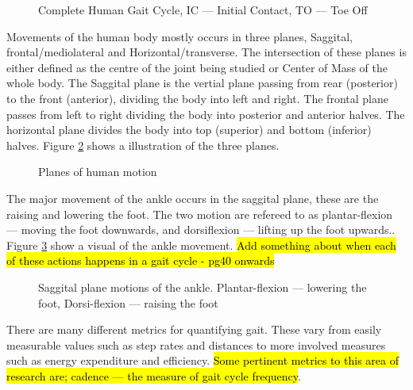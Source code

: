 \begin{figure}[hbt!]
    \centering
    \caption{Complete Human Gait Cycle, IC --- Initial Contact, TO --- Toe Off}
    \label{fig:background_gait_cycle}
\end{figure}

Movements of the human body mostly occurs in three planes, Saggital, frontal/mediolateral and Horizontal/transverse. The intersection of these planes is either defined as the centre of the joint being studied or Center of Mass of the whole body. The Saggital plane is the vertial plane passing from rear (posterior) to the front (anterior), dividing the body into left and right. The frontal plane passes from left to right dividing the body into posterior and anterior halves. The horizontal plane divides the body into top (superior) and bottom (inferior) halves.\cite{Bartlett2007} Figure \ref{fig:background_planes_of_the_body} shows a illustration of the three planes.

\begin{figure}[!hbt]
    \centering
    \caption{Planes of human motion}
    \label{fig:background_planes_of_the_body}
\end{figure}

The major movement of the ankle occurs in the saggital plane, these are the raising and lowering the foot. The two motion are refereed to as plantar-flexion --- moving the foot downwards, and dorsiflexion --- lifting up the foot upwards.\cite{Bartlett2007}. Figure \ref{fig:background_plantar_dorsi_flexion} show a visual of the ankle movement. \hl{Add something about when each of these actions happens in a gait cycle{\cite{Whittle2012}} - pg40 onwards}

\begin{figure}[!hbt]
    \centering
    \caption{Saggital plane motions of the ankle. Plantar-flexion --- lowering the foot, Dorsi-flexion --- raising the foot}
    \label{fig:background_plantar_dorsi_flexion}
\end{figure}


There are many different metrics for quantifying gait. These vary from easily measurable values such as step rates and distances to more involved measures such as energy expenditure and efficiency. \hl{Some pertinent metrics to this area of research are; cadence --- the measure of gait cycle frequency}\cite{Ramakrishnan2019, Coutts1999}.


